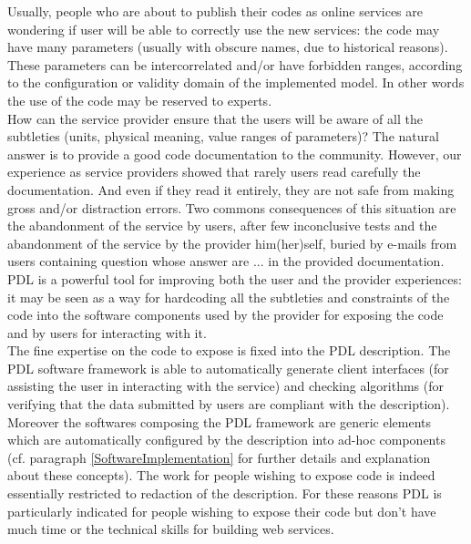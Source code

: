 \documentclass[a4paper,11pt] {ivoa}
\begin{document}
 Usually, people who are about to publish their codes as online services are wondering if user will be able to correctly use the new services: the code may have many parameters (usually with obscure names,  due to historical reasons). These parameters can be intercorrelated and/or have forbidden ranges, according to the configuration or validity domain of the implemented model. In other words the use of the code may be reserved to experts.\\
How can the service provider ensure that the users will be aware of all the subtleties (units, physical meaning, value ranges of parameters)? The natural answer is to provide a good code documentation to the community. However, our experience as service providers showed that rarely users read carefully the documentation. And even if they read it entirely, they are not safe from making gross and/or distraction errors. 
Two commons consequences of this situation are the abandonment of the service by users, after few inconclusive tests and
the abandonment of the service by the provider him(her)self, buried by e-mails from users containing question whose answer are ... in the provided documentation.\\
PDL is a powerful tool for improving both the user and the provider experiences: it may be seen as a way for hardcoding all the subtleties and constraints of the code into the software components used by the provider for exposing the code and by users for interacting with it.\\
The fine expertise on the code to expose is fixed into the PDL description. The PDL software framework is able to automatically generate client interfaces (for assisting the user in interacting with the service) and checking algorithms (for verifying that the data submitted by users are compliant with the description). Moreover the softwares composing the PDL framework are generic elements which are automatically configured by the description into ad-hoc components (cf. paragraph \ref{SoftwareImplementation} for further details and explanation about these concepts). The work for people wishing to expose code is indeed essentially restricted to redaction of the description. For these reasons PDL is particularly indicated for people wishing to expose their code but  don't have much time or the technical skills for building web services.\\
\end{document}
